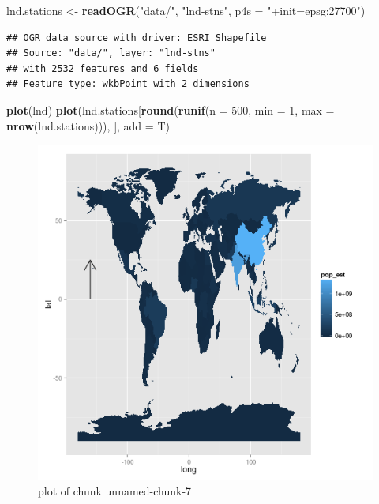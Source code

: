 \documentclass[]{article}
\makeatletter
\newenvironment{Shaded}{}{}
\newcommand{\KeywordTok}[1]{\textcolor[rgb]{0.00,0.44,0.13}{\textbf{{#1}}}}
\newcommand{\DataTypeTok}[1]{\textcolor[rgb]{0.56,0.13,0.00}{{#1}}}
\newcommand{\DecValTok}[1]{\textcolor[rgb]{0.25,0.63,0.44}{{#1}}}
\newcommand{\StringTok}[1]{\textcolor[rgb]{0.25,0.44,0.63}{{#1}}}
\newcommand{\NormalTok}[1]{{#1}}
\def\maxwidth{\ifdim\Gin@nat@width>\linewidth\linewidth
\else\Gin@nat@width\fi}
\let\Oldincludegraphics\includegraphics
\renewcommand{\includegraphics}[1]{\Oldincludegraphics[width=\maxwidth]{#1}}
\makeatother
\begin{document}
\begin{Shaded}
\begin{Highlighting}[]
\NormalTok{lnd.stations <-}\StringTok{ }\KeywordTok{readOGR}\NormalTok{(}\StringTok{"data/"}\NormalTok{, }\StringTok{"lnd-stns"}\NormalTok{, }\DataTypeTok{p4s =} \StringTok{"+init=epsg:27700"}\NormalTok{)}
\end{Highlighting}
\end{Shaded}

\begin{verbatim}
## OGR data source with driver: ESRI Shapefile 
## Source: "data/", layer: "lnd-stns"
## with 2532 features and 6 fields
## Feature type: wkbPoint with 2 dimensions
\end{verbatim}

\begin{Shaded}
\begin{Highlighting}[]
\KeywordTok{plot}\NormalTok{(lnd)}
\KeywordTok{plot}\NormalTok{(lnd.stations[}\KeywordTok{round}\NormalTok{(}\KeywordTok{runif}\NormalTok{(}\DataTypeTok{n =} \DecValTok{500}\NormalTok{, }\DataTypeTok{min =} \DecValTok{1}\NormalTok{, }\DataTypeTok{max =} \KeywordTok{nrow}\NormalTok{(lnd.stations))), }
    \NormalTok{], }\DataTypeTok{add =} \NormalTok{T)}
\end{Highlighting}
\end{Shaded}

\begin{figure}[htbp]
\centering
\includegraphics{figure/unnamed-chunk-7.png}
\caption{plot of chunk unnamed-chunk-7}
\end{figure}
\end{document}
